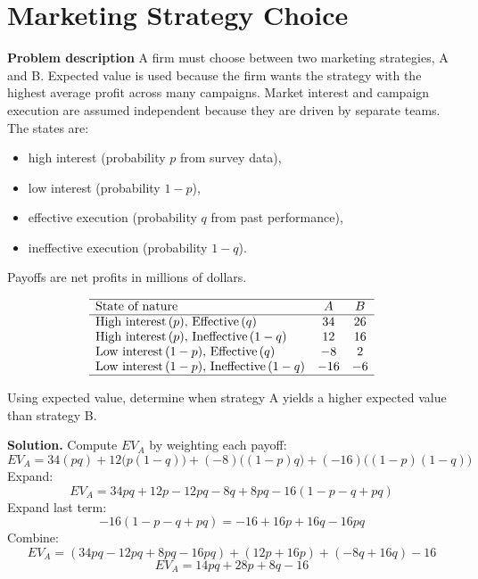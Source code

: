 \begin{ExamProblems}
		
		\hypertarget{c7-ex9}{}
		\item
		\section{Marketing Strategy Choice}
		
		\textbf{Problem description}
		A firm must choose between two marketing strategies, A and B. Expected value is used because the firm wants the strategy with the highest average profit across many campaigns. Market interest and campaign execution are assumed independent because they are driven by separate teams. The states are:
		\begin{itemize}
			\item high interest (probability \(p\) from survey data),
			\item low interest (probability \(1-p\)),
			\item effective execution (probability \(q\) from past performance),
			\item ineffective execution (probability \(1-q\)).
		\end{itemize}
		Payoffs are net profits in millions of dollars.
		
		\[
		\begin{array}{lcc}
			\hline
			\text{State of nature} & A & B \\
			\hline
			\text{High interest}\,(p),\,\text{Effective}\,(q) & 34 & 26 \\
			\text{High interest}\,(p),\,\text{Ineffective}\,(1-q) & 12 & 16 \\
			\text{Low interest}\,(1-p),\,\text{Effective}\,(q) & -8 & 2 \\
			\text{Low interest}\,(1-p),\,\text{Ineffective}\,(1-q) & -16 & -6 \\
			\hline
		\end{array}
		\]
		
		Using expected value, determine when strategy A yields a higher expected value than strategy B.
		
		\textbf{Solution.}
		Compute \(EV_A\) by weighting each payoff:
		\[
		EV_A=34(pq)+12\bigl(p(1-q)\bigr)+(-8)\bigl((1-p)q\bigr)+(-16)\bigl((1-p)(1-q)\bigr)
		\]
		Expand:
		\[
		EV_A=34pq + 12p - 12pq - 8q + 8pq - 16(1-p-q+pq)
		\]
		Expand last term:
		\[
		-16(1-p-q+pq)=-16 + 16p + 16q - 16pq
		\]
		Combine:
		\[
		EV_A=(34pq-12pq+8pq-16pq) + (12p+16p) + (-8q+16q) - 16
		\]
		\[
		EV_A=14pq + 28p + 8q - 16
		\]
		

\end{ExamProblems}
